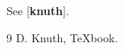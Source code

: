 \documentclass{article}
\renewcommand\cite[1]{[\textbf{#1}]}
\begin{document}
See \cite{knuth}.
\begin{thebibliography}{9} D. Knuth, TeXbook.\end{thebibliography}
\end{document}
